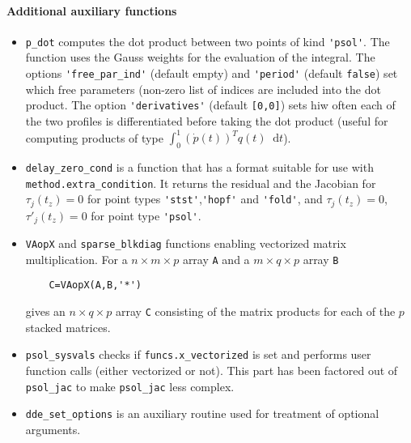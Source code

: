 \documentclass[11pt]{scrartcl}
\renewcommand{\d}{\mathop{}\!\mathrm{d}}
\newcommand{\blist}[1]{\mbox{\lstinline!#1!}}
\begin{document}
\paragraph{Additional auxiliary functions}
\begin{itemize}
\item \blist{p_dot} computes the dot product between two points of
  kind \blist{'psol'}. The function uses the Gauss weights for the
  evaluation of the integral. The options \blist{'free_par_ind'}
  (default empty) and \blist{'period'} (default \blist{false}) set
  which free parameters (non-zero list of indices are included into
  the dot product. The option \blist{'derivatives'} (default
  \blist{[0,0]}) sets hiw often each of the two profiles is
  differentiated before taking the dot product (useful for computing
  products of type $\int_0^1(\dot p(t))^Tq(t)\d t$).
\item \blist{delay_zero_cond} is a function that has a format suitable
  for use with \blist{method.extra_condition}. It returns the residual
  and the Jacobian for $\tau_j(t_z)=0$ for point types
  \blist{'stst'},\blist{'hopf'} and \blist{'fold'}, and
  $\tau_j(t_z)=0$, $\tau'_j(t_z)=0$ for point type \blist{'psol'}.
\item \blist{VAopX} and \blist{sparse_blkdiag} functions enabling
  vectorized matrix multiplication. For a $n\times m\times p$ array
  \blist{A} and a $m\times q\times p$ array \blist{B}
  \begin{lstlisting}
    C=VAopX(A,B,'*')
  \end{lstlisting}
  gives an $n\times q\times p$ array \blist{C} consisting of the
  matrix products for each of the $p$ stacked matrices.
\item \blist{psol_sysvals} checks if \blist{funcs.x_vectorized} is set
  and performs user function calls (either vectorized or not). This part
  has been factored out of \blist{psol_jac} to make \blist{psol_jac}
  less complex.
\item \blist{dde_set_options} is an auxiliary routine used for
  treatment of optional arguments.
\end{itemize}
\end{document}
